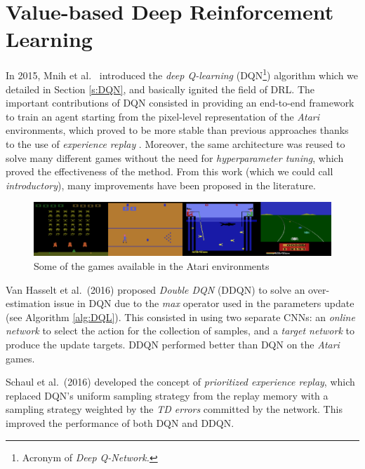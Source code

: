 \section{Value-based Deep Reinforcement Learning} \label{SOA:value}
In 2015, Mnih et al.\ \cite{mnih2015human} introduced the \textit{deep 
Q-learning} (DQN\footnote{Acronym of \textit{Deep Q-Network.}}) algorithm which 
we detailed in Section \ref{s:DQN}, and basically ignited the field of DRL.
The important contributions of DQN consisted in providing an end-to-end 
framework to train an agent starting from the pixel-level representation of the 
\textit{Atari} environments, which proved to be more stable than previous 
approaches thanks to the use of \textit{experience replay} \cite{lin1992self}. 
Moreover, the same architecture was reused to solve many different games without
the need for \textit{hyperparameter tuning}, which proved the effectiveness of 
the method. 
From this work (which we could call \textit{introductory}), many improvements
have been proposed in the literature.
%
\begin{figure}[h]
\includegraphics[width=\textwidth]{pictures/atari}
\centering
\caption{Some of the games available in the Atari environments}
\end{figure}
%
Van Hasselt et al.\ (2016) proposed \textit{Double DQN} (DDQN) \cite{van2016deep} 
to solve an over-estimation issue in DQN due to the \textit{max} operator used 
in the parameters update (see Algorithm \ref{alg:DQL}). This consisted in using 
two separate CNNs: an \textit{online network} to select the action for the 
collection of samples, and a \textit{target network} to produce the update 
targets. DDQN performed better than DQN on the \textit{Atari} games. 

Schaul et al.\ (2016) \cite{schaul2016prioritized} developed the concept
of \textit{prioritized experience replay}, which replaced DQN's uniform sampling 
strategy from the replay memory with a sampling strategy weighted by the 
\textit{TD errors} committed by the network. This improved the performance of 
both DQN and DDQN.

